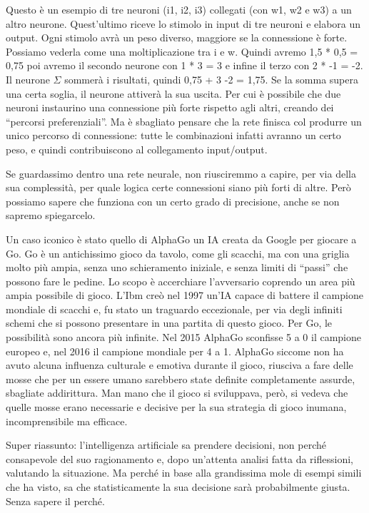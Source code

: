 \documentclass[12pt]{book} %
\begin{document}
Questo è un esempio di tre neuroni (i1, i2, i3) collegati (con w1, w2 e w3) a un altro neurone.
Quest'ultimo riceve lo stimolo in input di tre neuroni e elabora un output. Ogni stimolo avrà un
peso diverso, maggiore se la connessione è forte. Possiamo vederla come una moltiplicazione tra i e w. Quindi avremo
1,5 * 0,5 = 0,75 poi avremo il secondo neurone con 1 * 3 = 3 e infine il terzo con 2 * -1 = -2. Il neurone $\Sigma $
sommerà i risultati, quindi 0,75 + 3 -2 = 1,75. Se la somma supera una certa soglia, il neurone attiverà la sua uscita.
Per cui è possibile che due neuroni instaurino una connessione più forte rispetto agli altri, creando dei “percorsi
preferenziali”. Ma è sbagliato pensare che la rete finisca col produrre un unico percorso di connessione: tutte le
combinazioni infatti avranno un certo peso, e quindi contribuiscono al collegamento input/output.

Se guardassimo dentro una rete neurale, non riusciremmo a capire, per via della sua complessità, per quale logica certe
connessioni siano più forti di altre. Però possiamo sapere che funziona con un certo grado di precisione, anche se non
sapremo spiegarcelo. 

Un caso iconico è stato quello di AlphaGo un IA creata da Google per giocare a Go. Go è un antichissimo gioco da tavolo,
come gli scacchi, ma con una griglia molto più ampia, senza uno schieramento iniziale, e senza limiti di “passi” che
possono fare le pedine. Lo scopo è accerchiare l'avversario coprendo un area più ampia possibile
di gioco. L'Ibm creò nel 1997 un'IA capace di battere il campione mondiale di
scacchi e, fu stato un traguardo eccezionale, per via degli infiniti schemi che si possono presentare in una partita di
questo gioco. Per Go, le possibilità sono ancora più infinite. Nel 2015 AlphaGo sconfisse 5 a 0 il campione europeo e,
nel 2016 il campione mondiale per 4 a 1. AlphaGo siccome non ha avuto alcuna influenza culturale e emotiva durante il
gioco, riusciva a fare delle mosse che per un essere umano sarebbero state definite completamente assurde, sbagliate
addirittura. Man mano che il gioco si sviluppava, però, si vedeva che quelle mosse erano necessarie e decisive per la
sua strategia di gioco inumana, incomprensibile ma efficace.


\bigskip

Super riassunto: l'intelligenza artificiale sa prendere decisioni, non perché consapevole del suo
ragionamento e, dopo un'attenta analisi fatta da riflessioni, valutando la situazione. Ma perché
in base alla grandissima mole di esempi simili che ha visto, sa che statisticamente la sua decisione sarà probabilmente
giusta. Senza sapere il perché.
\end{document}
